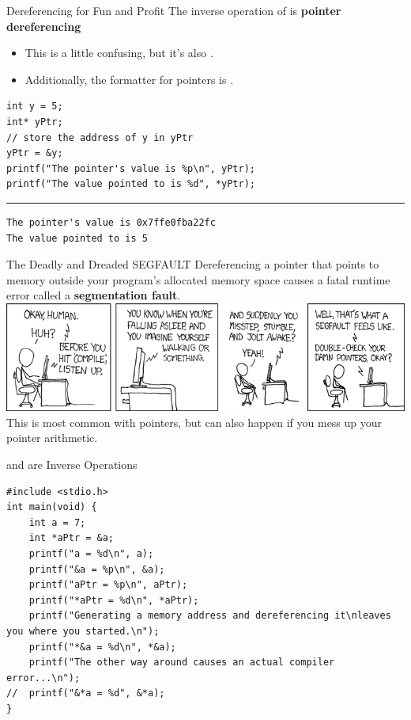 \documentclass[11pt]{beamer}
\let\OldTexttt\texttt
\renewcommand{\texttt}[1]{\OldTexttt{\color{teal}{#1}}}
\begin{document}
\begin{frame}[fragile=singleslide]{Dereferencing for Fun and Profit}
The inverse operation of \texttt{\&} is \textbf{pointer dereferencing}
\begin{itemize}
\item This is a little confusing, but it's also \texttt{*}.
\item Additionally, the formatter for pointers is \texttt{\%p}.
\end{itemize}
\begin{lstlisting}[style = C]
int y = 5;
int* yPtr;
// store the address of y in yPtr
yPtr = &y;
printf("The pointer's value is %p\n", yPtr);
printf("The value pointed to is %d", *yPtr);
\end{lstlisting}
\hrule
\begin{verbatim}
The pointer's value is 0x7ffe0fba22fc
The value pointed to is 5
\end{verbatim}
\end{frame}

\begin{frame}{The Deadly and Dreaded SEGFAULT}
Dereferencing a pointer that points to memory outside your program's allocated memory space causes a fatal runtime error called a \textbf{segmentation fault}.
\center
\includegraphics[scale=0.4]{compiler_complaint.png}
This is most common with \texttt{NULL} pointers, but can also happen if you mess up your pointer arithmetic.
\end{frame}

\begin{frame}[fragile=singleslide]{\texttt{\&} and \texttt{*} are Inverse Operations}
\begin{lstlisting}[style=C]
#include <stdio.h>
int main(void) {
	int a = 7;
	int *aPtr = &a;
	printf("a = %d\n", a);
	printf("&a = %p\n", &a);
	printf("aPtr = %p\n", aPtr);
	printf("*aPtr = %d\n", *aPtr);
	printf("Generating a memory address and dereferencing it\nleaves you where you started.\n");
	printf("*&a = %d\n", *&a);
	printf("The other way around causes an actual compiler error...\n");
//	printf("&*a = %d", &*a);
}
\end{lstlisting}
\end{frame}
\end{document}

